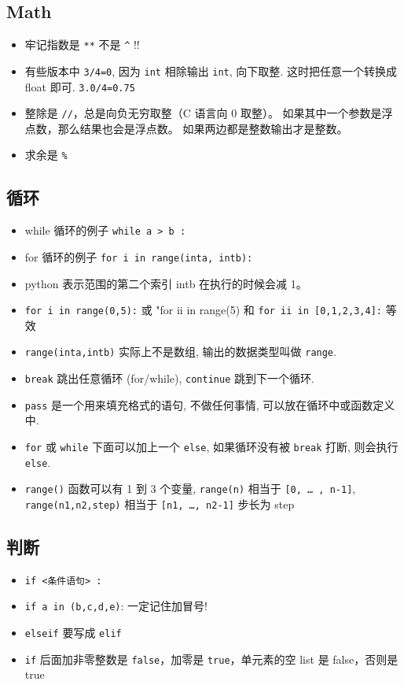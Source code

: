 \subsection{Math}
\begin{itemize}
\item 牢记指数是 \verb`**` 不是 \verb`^` !!
\item 有些版本中 \verb`3/4=0`, 因为 \verb`int` 相除输出 \verb`int`, 向下取整. 这时把任意一个转换成 float 即可. \verb`3.0/4=0.75`
\item 整除是 \verb`//`，总是向负无穷取整（C 语言向 0 取整）。 如果其中一个参数是浮点数，那么结果也会是浮点数。 如果两边都是整数输出才是整数。
\item 求余是 \verb`%`
\end{itemize}

\subsection{循环}
\begin{itemize}
\item while 循环的例子  \verb`while a > b :`
\item for 循环的例子 \verb`for i in range(inta, intb):`
\item python 表示范围的第二个索引 intb 在执行的时候会减 1。
\item \verb`for i in range(0,5):` 或 "for ii in range(5) 和 \verb`for ii in [0,1,2,3,4]:` 等效
\item \verb`range(inta,intb)` 实际上不是数组, 输出的数据类型叫做 \verb`range`.
\item \verb`break` 跳出任意循环 (for/while), \verb`continue` 跳到下一个循环.
\item \verb`pass` 是一个用来填充格式的语句, 不做任何事情, 可以放在循环中或函数定义中.
\item \verb`for` 或 \verb`while` 下面可以加上一个 \verb`else`, 如果循环没有被 \verb`break` 打断, 则会执行 \verb`else`.
\item \verb`range()` 函数可以有 1 到 3 个变量, \verb`range(n)` 相当于 \verb`[0, … , n-1]`, \verb`range(n1,n2,step)` 相当于 \verb`[n1, …, n2-1]` 步长为 step 
\end{itemize}

\subsection{判断}
\begin{itemize}
\item \verb`if <条件语句> :`
\item \verb`if a in (b,c,d,e)`:   一定记住加冒号!
\item \verb`elseif` 要写成 \verb`elif`
\item \verb`if` 后面加非零整数是 \verb`false`，加零是 \verb`true`，单元素的空 list 是 false，否则是 true
\end{itemize}

